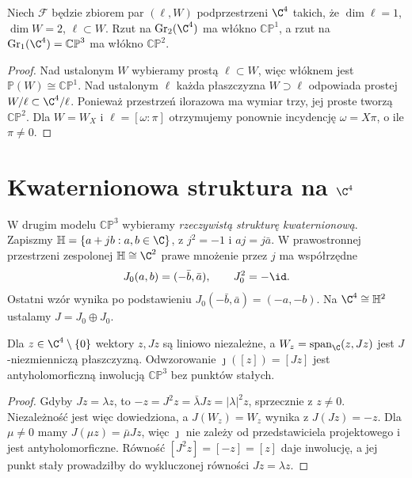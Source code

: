 \begin{stwierdzenie}
\label{prop:lin32-flagi}
Niech $\mathcal F$ będzie zbiorem par
$(\ell,W)$ podprzestrzeni $\C^4$
takich, że $\dim\ell=1$, $\dim W=2$,
$\ell\subset W$. Rzut na
$\operatorname{Gr}_2(\C^4)$ ma włókno
$\mathbb{CP}^1$, a rzut na
$\operatorname{Gr}_1(\C^4)=\mathbb{CP}^3$
ma włókno $\mathbb{CP}^2$.
\end{stwierdzenie}
\begin{proof}
Nad ustalonym $W$ wybieramy prostą
$\ell\subset W$, więc włóknem jest
$\mathbb P(W)\cong\mathbb{CP}^1$.
Nad ustalonym $\ell$ każda
płaszczyzna $W\supset\ell$ odpowiada
prostej $W/\ell\subset\C^4/\ell$.
Ponieważ przestrzeń ilorazowa ma
wymiar trzy, jej proste tworzą
$\mathbb{CP}^2$.
Dla $W=W_X$ i $\ell=[\omega:\pi]$
otrzymujemy ponownie incydencję
$\omega=X\pi$, o ile $\pi\ne0$.
\end{proof}

\section{Kwaternionowa struktura na \texorpdfstring{$\C^4$}{C4}}
\label{sec:lin32-j}
W drugim modelu $\mathbb{CP}^3$ wybieramy
\emph{rzeczywistą strukturę kwaternionową}.
Zapiszmy $\mathbb H=\{a+jb:a,b\in\C\}$,
z $j^2=-1$ i $aj=j\bar a$.
W prawostronnej przestrzeni zespolonej
$\mathbb H\cong\C^2$ prawe mnożenie przez $j$
ma współrzędne
\[
 J_0(a,b)=(-\bar b,\bar a),\qquad
 J_0^2=-\id.
\]
Ostatni wzór wynika po podstawieniu
$J_0(-\bar b,\bar a)=(-a,-b)$.
Na $\C^4\cong\mathbb H^2$ ustalamy
$J=J_0\oplus J_0$.

\begin{lemat}
\label{lem:lin32-rzeczywista}
Dla $z\in\C^4\setminus\{0\}$ wektory
$z,Jz$ są liniowo niezależne,
a $W_z=\operatorname{span}_\C(z,Jz)$
jest $J$-niezmienniczą płaszczyzną.
Odwzorowanie $\jmath([z])=[Jz]$
jest antyholomorficzną inwolucją
$\mathbb{CP}^3$ bez punktów stałych.
\end{lemat}
\begin{proof}
Gdyby $Jz=\lambda z$, to
$-z=J^2z=\bar\lambda Jz=|\lambda|^2z$,
sprzecznie z $z\ne0$.
Niezależność jest więc dowiedziona,
a $J(W_z)=W_z$ wynika z $J(Jz)=-z$.
Dla $\mu\ne0$ mamy
$J(\mu z)=\bar\mu Jz$, więc
$\jmath$ nie zależy od przedstawiciela
projektowego i jest antyholomorficzne.
Równość $[J^2z]=[-z]=[z]$
daje inwolucję, a jej punkt stały
prowadziłby do wykluczonej równości
$Jz=\lambda z$.
\end{proof}

